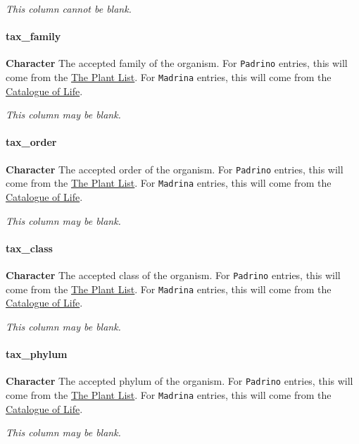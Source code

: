 \documentclass[]{article}
\let\oldparagraph\paragraph
\renewcommand{\paragraph}[1]{\oldparagraph{#1}\mbox{}}
\begin{document}
\emph{This column cannot be blank.}

\paragraph{tax\_family}\label{tax_family}

\textbf{Character} The accepted family of the organism. For
\texttt{Padrino} entries, this will come from the
\href{http://www.theplantlist.org/}{The Plant List}. For
\texttt{Madrina} entries, this will come from the
\href{http://www.catalogueoflife.org/}{Catalogue of Life}.

\emph{This column may be blank.}

\paragraph{tax\_order}\label{tax_order}

\textbf{Character} The accepted order of the organism. For
\texttt{Padrino} entries, this will come from the
\href{http://www.theplantlist.org/}{The Plant List}. For
\texttt{Madrina} entries, this will come from the
\href{http://www.catalogueoflife.org/}{Catalogue of Life}.

\emph{This column may be blank.}

\paragraph{tax\_class}\label{tax_class}

\textbf{Character} The accepted class of the organism. For
\texttt{Padrino} entries, this will come from the
\href{http://www.theplantlist.org/}{The Plant List}. For
\texttt{Madrina} entries, this will come from the
\href{http://www.catalogueoflife.org/}{Catalogue of Life}.

\emph{This column may be blank.}

\paragraph{tax\_phylum}\label{tax_phylum}

\textbf{Character} The accepted phylum of the organism. For
\texttt{Padrino} entries, this will come from the
\href{http://www.theplantlist.org/}{The Plant List}. For
\texttt{Madrina} entries, this will come from the
\href{http://www.catalogueoflife.org/}{Catalogue of Life}.

\emph{This column may be blank.}
\end{document}
